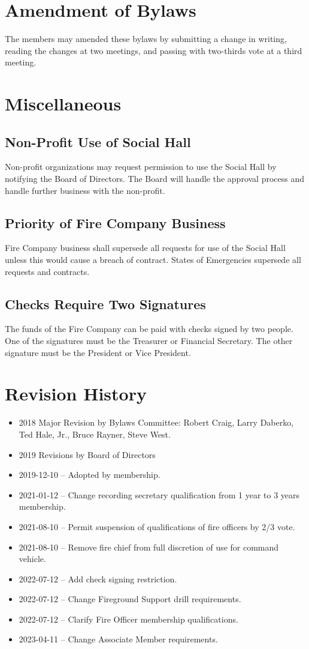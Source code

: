 ﻿\documentclass[12pt,letterpaper]{article}
\begin{document}
\section{Amendment of Bylaws}
The members may amended these bylaws by submitting a change in writing, reading the changes at two meetings, and passing with two-thirds vote at a third meeting.

\section{Miscellaneous}

\subsection{Non-Profit Use of Social Hall}
Non-profit organizations may request permission to use the Social Hall by notifying the Board of Directors.  The Board will handle the approval process and handle further business with the non-profit.
\subsection{Priority of Fire Company Business}
Fire Company business shall supersede all requests for use of the Social Hall unless this would cause a breach of contract.  States of Emergencies supersede all requests and contracts.

\subsection{Checks Require Two Signatures}
The funds of the Fire Company can be paid with checks signed by two people.  One of the signatures must be the Treasurer or Financial Secretary.  The other signature must be the President or Vice President.


\section{Revision History}
\begin{itemize}
\item 2018 Major Revision by Bylaws Committee: Robert Craig, Larry Daberko, Ted Hale, Jr., Bruce Rayner, Steve West.
\item 2019 Revisions by Board of Directors
\item 2019-12-10 – Adopted by membership.
\item 2021-01-12 – Change recording secretary qualification from 1 year to 3 years membership.
\item 2021-08-10 – Permit suspension of qualifications of fire officers by 2/3 vote.
\item 2021-08-10 – Remove fire chief from full discretion of use for command vehicle.
\item 2022-07-12 – Add check signing restriction.
\item 2022-07-12 – Change Fireground Support drill requirements.
\item 2022-07-12 – Clarify Fire Officer membership qualifications.
\item 2023-04-11 – Change Associate Member requirements.
\end{itemize}
\end{document}
